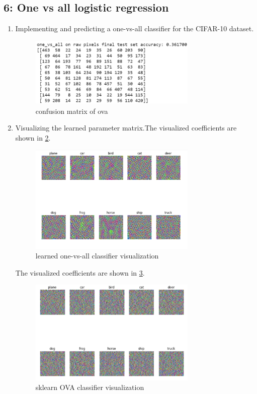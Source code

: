 \documentclass[]{book}
\theoremstyle{definition}
\begin{document}
\subsection*{6: One vs all logistic regression  }
\begin{enumerate}
	\item Implementing and predicting a one-vs-all classifier for the CIFAR-10 dataset.
	
	\begin{figure}[H]
		\centering
		\includegraphics[width=8cm]{ova.png}
		\caption{confusion matrix of ova}
		\label{fig:1}
	\end{figure}
	\item Visualizing the learned parameter matrix.The visualized coefficients are shown in \ref{fig:2}.
	
	\begin{figure}[H]
		\centering
		\includegraphics[width=8cm]{ova_1.png}
		\caption{learned one-vs-all classifier visualization}
		\label{fig:2}
	\end{figure}
The visualized coefficients are shown in \ref{fig:3}.
	\begin{figure}[H]
		\centering
		\includegraphics[width=8cm]{ova_2.png}
		\caption{sklearn OVA classifier visualization}
		\label{fig:3}
	\end{figure}
	
\end{enumerate}
\end{document}
